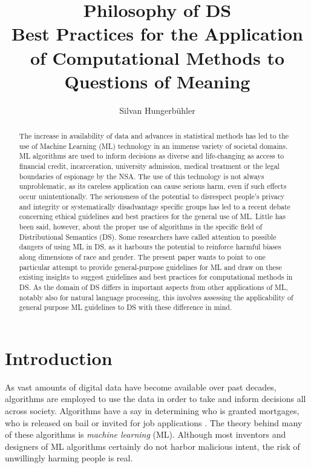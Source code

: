 \documentclass{article}
\title{Philosophy of DS\\
\large Best Practices for the Application of Computational Methods to Questions of Meaning}
\date{}
\author{Silvan Hungerb{\"u}hler}
\begin{document}
\maketitle
\begin{abstract}
The increase in availability of data and advances in statistical methods has led to the use of Machine Learning (ML) technology in an immense variety of societal domains. ML algorithms are used to inform decisions as diverse and life-changing as access to financial credit, incarceration, university admission, medical treatment or the legal boundaries of espionage by the NSA.
The use of this technology is not always unproblematic, as its careless application can cause serious harm, even if such effects occur unintentionally.
The seriousness of the potential to disrespect people's privacy and integrity or systematically disadvantage specific groups has led to a recent debate concerning ethical guidelines and best practices for the general use of ML.
Little has been said, however, about the proper use of algorithms in the specific field of Distributional Semantics (DS). Some researchers have called attention to possible dangers of using ML in DS, as it harbours the potential to reinforce harmful biases along dimensions of race and gender.
The present paper wants to point to one particular attempt to provide general-purpose guidelines for ML and draw on these existing insights to suggest guidelines and best practices for computational methods in DS.
As the domain of DS differs in important aspects from other applications of ML, notably also for natural language processing,
this involves assessing  the applicability of general purpose ML guidelines to DS with these difference in mind.
\end{abstract}
\section{Introduction}
As vast amounts of digital data have become available over past decades, algorithms are employed to use the data in order to take and inform decisions all across society. 
Algorithms have a say in determining who is granted mortgages, who is released on bail or invited for job applications \cite{algorithms2016}.
The theory behind many of these algorithms is \emph{machine learning} (ML).
Although most inventors and designers of ML algorithms certainly do not harbor malicious intent, the risk of unwillingly harming people is real.
\end{document}
